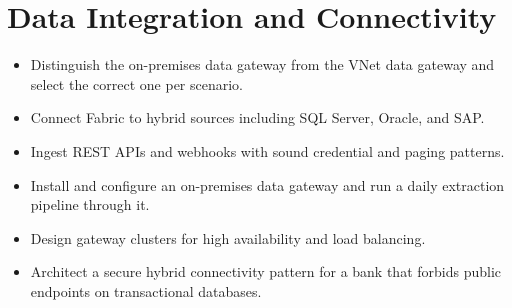 \chapter{Data Integration and Connectivity}
%

\begin{objectives}
\begin{itemize}
    \item Distinguish the on-premises data gateway from the VNet data gateway and select the correct one per scenario.
    \item Connect Fabric to hybrid sources including SQL Server, Oracle, and SAP.
    \item Ingest REST APIs and webhooks with sound credential and paging patterns.
    \item Install and configure an on-premises data gateway and run a daily extraction pipeline through it.
    \item Design gateway clusters for high availability and load balancing.
    \item Architect a secure hybrid connectivity pattern for a bank that forbids public endpoints on transactional databases.
\end{itemize}
\end{objectives}

